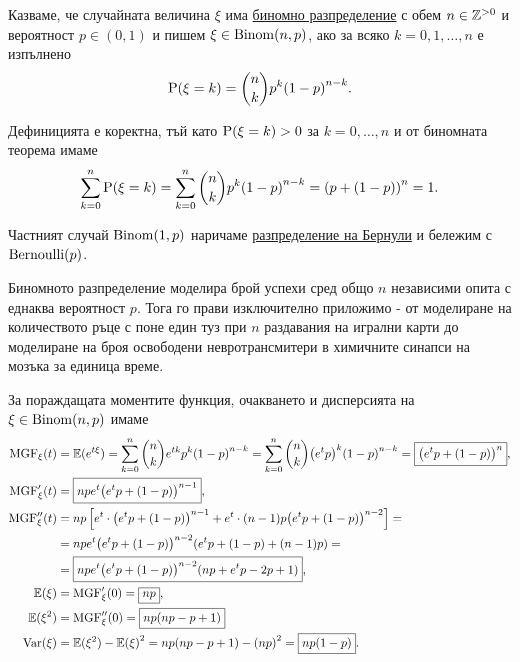 \documentclass[numbers=endperiod, DIV=15, bibliography=totocnumbered]{scrartcl}
\begin{document}
\begin{definition}
  Казваме, че случайната величина $\xi$ има \uline{биномно разпределение} с обем $n \in \mathbb{Z}^{> 0}$ и вероятност $p \in (0, 1)$ и пишем $\xi \in \operatorname{Binom}(n, p)$, ако за всяко $k = 0, 1, \ldots, n$ е изпълнено
  \begin{displaymath}
    \operatorname{P}(\xi = k) = {n \choose k} p^k {(1-p)}^{n-k}.
  \end{displaymath}

  Дефиницията е коректна, тъй като $\operatorname{P}(\xi = k) > 0$ за $k = 0, \ldots, n$ и от биномната теорема имаме
  \begin{displaymath}
    \sum_{k=0}^n \operatorname{P}(\xi = k)
    =
    \sum_{k=0}^n {n \choose k} p^k {(1-p)}^{n-k}
    =
    {(p+(1-p))}^n = 1.
  \end{displaymath}

  Частният случай $\operatorname{Binom}(1, p)$ наричаме \uline{разпределение на Бернули} и бележим с $\operatorname{Bernoulli}(p)$.
\end{definition}

Биномното разпределение моделира брой успехи сред общо $n$ независими опита с еднаква вероятност $p$. Тога го прави изключително приложимо - от моделиране на количеството ръце с поне един туз при $n$ раздавания на игрални карти до моделиране на броя освободени невротрансмитери в химичните синапси на мозъка за единица време.

За пораждащата моментите функция, очакването и дисперсията на $\xi \in \operatorname{Binom}(n, p)$ имаме
\begingroup
\allowdisplaybreaks
\begin{align*}
  \operatorname{MGF}_\xi(t)
  &=
  \mathbb{E}(e^{t\xi})
  =
  \sum_{k=0}^n {n \choose k} e^{tk} p^k {(1-p)}^{n-k}
  =
  \sum_{k=0}^n {n \choose k} {\left( e^t p \right)}^k {(1-p)}^{n-k}
  =
  \boxed{{\left( e^t p + (1-p) \right)}^n},
  \\
  \operatorname{MGF}'_\xi(t)
  &=
  \boxed{n p e^t {\left( e^t p + (1-p) \right)}^{n-1}},
  \\
  \operatorname{MGF}''_\xi(t)
  &=
  n p \left[ e^t \cdot {\left( e^t p + (1-p) \right)}^{n-1} + e^t \cdot (n-1) p {\left( e^t p + (1-p) \right)}^{n-2} \right]
  = \\ &=
  n p e^t {\left( e^t p + (1-p) \right)}^{n-2} (e^t p + (1-p) + (n-1)p)
  = \\ &=
  \boxed{n p e^t {\left( e^t p + (1-p) \right)}^{n-2} (np + e^t p - 2p + 1)},
  \\
  \mathbb{E}(\xi)
  &=
  \operatorname{MGF}'_\xi(0)
  =
  \boxed{np},
  \\
  \mathbb{E}(\xi^2)
  &=
  \operatorname{MGF}''_\xi(0)
  =
  \boxed{np(np - p + 1)}
  \\
  \operatorname{Var}(\xi)
  &=
  \mathbb{E}(\xi^2) - {\mathbb{E}(\xi)}^2
  =
  np(np - p + 1) - {(np)}^2
  =
  \boxed{np(1 - p)}.
\end{align*}
\endgroup
\end{document}
